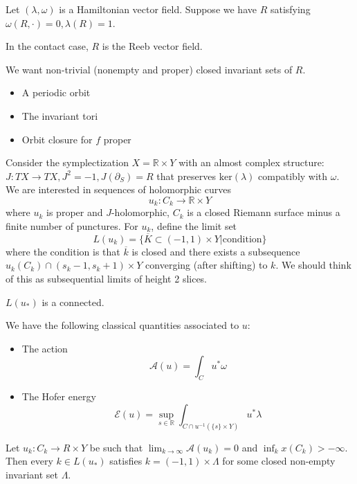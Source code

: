Let $(\lambda, \omega)$ is a Hamiltonian vector field. Suppose we have $R$ satisfying $\omega(R, \cdot)=0, \lambda(R)=1$.

\begin{example}

In the contact case, $R$ is the Reeb vector field.

\end{example}

We want non-trivial (nonempty and proper) closed invariant sets of $R$.

\begin{example}
\text{ }
\begin{itemize}
\item A periodic orbit
\item The invariant tori
\item Orbit closure for $f$ proper
\end{itemize}

\end{example}

Consider the symplectization $X=\mathbb{R}\times Y$ with an almost complex structure: $J: TX\to TX, J^2=-1, J(\partial_S)=R$ that preserves $\text{ker}(\lambda)$ compatibly with $\omega$. We are interested in sequences of holomorphic curves
\[
u_k: C_k \to \mathbb{R}\times Y
\]
where $u_k$ is proper and $J$-holomorphic, $C_k$ is a closed Riemann surface minus a finite number of punctures. For $u_k$, define the limit set
\[
L(u_k) = \{ \overline{K}\subset (-1, 1)\times Y | \text{condition}\}
\]
where the condition is that $\overline{k}$ is closed and there exists a subsequence $u_k(C_k) \cap (s_k-1, s_k+1)\times Y$ converging (after shifting) to $k$. We should think of this as subsequential limits of height 2 slices.

\begin{proposition}

$L(u_*)$ is a connected.

\end{proposition}

We have the following classical quantities associated to $u$:
\begin{itemize}
\item The action
    \[
    \mathcal{A}(u) = \int_C u^* \omega
    \]
\item The Hofer energy
    \[
    \mathcal{E}(u)=\sup_{s\in \mathbb{R}} \int_{C\cap u^{-1}(\{s\}\times Y)} u^*\lambda
    \]
\end{itemize}

\begin{theorem}

Let $u_k: C_k \to R\times Y$ be such that $\lim_{k\to \infty} \mathcal{A}(u_k)=0$ and $\inf_k x(C_k)>-\infty$. Then every $k\in L(u_*)$ satisfies $k=(-1,1) \times \Lambda$ for some closed non-empty invariant set $\Lambda$.

\end{theorem}

